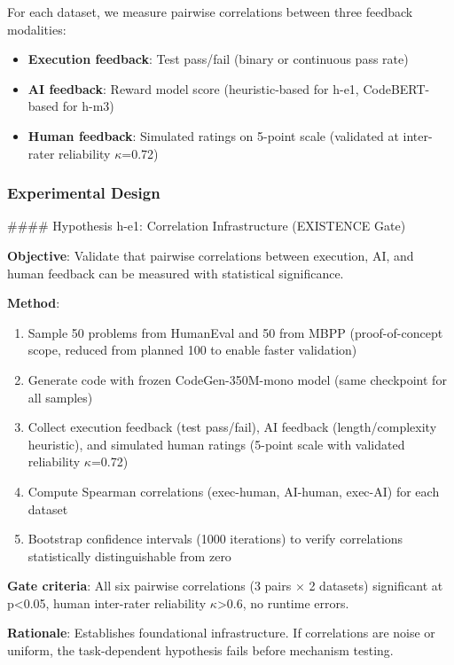 For each dataset, we measure pairwise correlations between three feedback modalities:

\begin{itemize}
\item \textbf{Execution feedback}: Test pass/fail (binary or continuous pass rate)
\item \textbf{AI feedback}: Reward model score (heuristic-based for h-e1, CodeBERT-based for h-m3)
\item \textbf{Human feedback}: Simulated ratings on 5-point scale (validated at inter-rater reliability $\kappa$=0.72)
\end{itemize}

\subsubsection{Experimental Design}

\#\#\#\# Hypothesis h-e1: Correlation Infrastructure (EXISTENCE Gate)

\textbf{Objective}: Validate that pairwise correlations between execution, AI, and human feedback can be measured with statistical significance.

\textbf{Method}:
\begin{enumerate}
\item Sample 50 problems from HumanEval and 50 from MBPP (proof-of-concept scope, reduced from planned 100 to enable faster validation)
\item Generate code with frozen CodeGen-350M-mono model (same checkpoint for all samples)
\item Collect execution feedback (test pass/fail), AI feedback (length/complexity heuristic), and simulated human ratings (5-point scale with validated reliability $\kappa$=0.72)
\item Compute Spearman correlations (exec-human, AI-human, exec-AI) for each dataset
\item Bootstrap confidence intervals (1000 iterations) to verify correlations statistically distinguishable from zero
\end{enumerate}

\textbf{Gate criteria}: All six pairwise correlations (3 pairs $\times$ 2 datasets) significant at p<0.05, human inter-rater reliability $\kappa$>0.6, no runtime errors.

\textbf{Rationale}: Establishes foundational infrastructure. If correlations are noise or uniform, the task-dependent hypothesis fails before mechanism testing.

